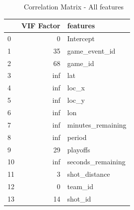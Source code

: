 \begin{figure}[!htb]
    \centering
    \caption{\label{fig:corr_matrix_allvars} Correlation Matrix - All features}
\end{figure}
\cite{cm}

\resizebox{.3 \textwidth}{!} {
\begin{tabular}{lrl}
    \toprule
    {} &  VIF Factor &                 features \\
    \midrule
    0  &           0 &                Intercept \\
    1  &          35 &            game\_event\_id \\
    2  &          68 &                  game\_id \\
    3  &         inf &                      lat \\
    4  &         inf &                    loc\_x \\
    5  &         inf &                    loc\_y \\
    6  &         inf &                      lon \\
    7  &         inf &        minutes\_remaining \\
    8  &         inf &                   period \\
    9  &          29 &                 playoffs \\
    10 &         inf &        seconds\_remaining \\
    11 &           3 &            shot\_distance \\
    12 &           0 &                  team\_id \\
    13 &          14 &                  shot\_id \\
    \bottomrule
    \end{tabular}
    }
    \label{tbl:vifs}

